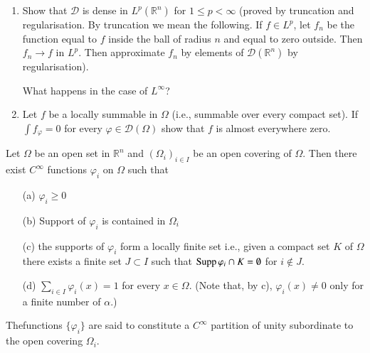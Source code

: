 \begin{exers*}
\begin{enumerate}
\renewcommand{\labelenumi}{(\theenumi)}
\item Show that $\mathcal{D}$ is dense in $L^{p}(\mathbb{R}^{n})$ for $1\leq p<\infty$ (proved by truncation and regularisation. By truncation we mean the following. If $f\in L^{p}$, let $f_{n}$ be the function equal to $f$ inside the ball of radius $n$ and equal to zero outside. Then $f_{n}\to f$ in $L^{p}$. Then approximate $f_{n}$ by elements of $\mathcal{D}(\mathbb{R}^{n})$ by regularisation).

What happens in the case of $L^{\infty}$?

\item Let $f$ be a locally summable in $\Omega$ (i.e., summable over every compact set). If $\int f_{\varphi}=0$ for every $\varphi\in \mathcal{D}(\Omega)$ show that $f$ is almost everywhere zero.
\end{enumerate}
\end{exers*}

\begin{theorem}\label{chap3-thm1}
Let $\Omega$ be an open set in $\mathbb{R}^{n}$ and $(\Omega_{i})_{i\in I}$ be an open covering of $\Omega$. Then there exist $C^{\infty}$ functions $\varphi_{i}$ on $\Omega$ such that
\begin{itemize}
\item[\rm(a)] $\varphi_{i}\geq 0$

\item[\rm(b)] Support of $\varphi_{i}$ is contained in $\Omega_{i}$

\item[\rm(c)] the supports of $\varphi_{i}$ form a locally finite set i.e., given a compact set $K$ of $\Omega$ there exists a finite set $J\subset I$ such that $\operatorname{Supp} \varphi_{i}\cap K=\emptyset$ for $i\not\in J$.

\item[\rm(d)] $\sum\limits_{i\in I}\varphi_{i}(x)=1$ for every $x\in \Omega$. (Note that, by {\rm c}), $\varphi_{i}(x)\neq 0$ only for a finite number of $\alpha$.) 
\end{itemize}
\end{theorem}

\begin{remark*}
The\pageoriginale functions $\{\varphi_{i}\}$ are said to constitute a $C^{\infty}$ partition of unity subordinate to the open covering $\Omega_{i}$.
\end{remark*}

